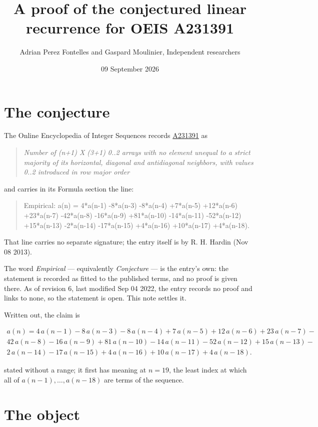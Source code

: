 \documentclass[11pt]{article}
\title{A proof of the conjectured linear recurrence for OEIS A231391}
\author{Adrian Perez Fontelles and Gaspard Moulinier, Independent researchers}
\date{09 September 2026}
\theoremstyle{definition}
\begin{document}
\maketitle
\section{The conjecture}

The Online Encyclopedia of Integer Sequences records \href{https://oeis.org/A231391}{A231391} as

\begin{quote}\itshape Number of (n+1) X (3+1) 0..2 arrays with no element unequal to a strict majority of its horizontal, diagonal and antidiagonal neighbors, with values 0..2 introduced in row major order\end{quote}

and carries in its Formula section the line:

\begin{quote}\ttfamily Empirical: a(n) = 4*a(n-1) -8*a(n-3) -8*a(n-4) +7*a(n-5) +12*a(n-6) +23*a(n-7) -42*a(n-8) -16*a(n-9) +81*a(n-10) -14*a(n-11) -52*a(n-12) +15*a(n-13) -2*a(n-14) -17*a(n-15) +4*a(n-16) +10*a(n-17) +4*a(n-18).\end{quote}

That line carries no separate signature; the entry itself is by R. H. Hardin (Nov 08 2013).

The word {\itshape Empirical} --- equivalently {\itshape Conjecture} --- is the entry's own: the statement is recorded as fitted to the published terms, and no proof is given there. As of revision 6, last modified Sep 04 2022, the entry records no proof and links to none, so the statement is open. This note settles it.

Written out, the claim is

\begin{multline*} a(n) = 4\,a(n-1) - 8\,a(n-3) - 8\,a(n-4) + 7\,a(n-5) + 12\,a(n-6) + 23\,a(n-7) - \\ 42\,a(n-8) - 16\,a(n-9) + 81\,a(n-10) - 14\,a(n-11) - 52\,a(n-12) + 15\,a(n-13) - \\ 2\,a(n-14) - 17\,a(n-15) + 4\,a(n-16) + 10\,a(n-17) + 4\,a(n-18). \end{multline*}

stated without a range; it first has meaning at $n = 19$, the least index at which all of $a(n-1),\dots,a(n-18)$ are terms of the sequence.

\section{The object}
\end{document}
